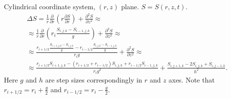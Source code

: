 \documentclass[a4paper,10pt]{article}
\begin{document}
Cylindrical coordinate system,  $(r,z)$ plane. $S = S(r, z, t)$.
\begin{multline}
    \Delta S = \frac{1}{r} \frac{\partial}{\partial r}
    \left( r \frac{\partial S}{\partial r} \right) +
    \frac{\partial^2 S}{\partial z^2}
    \approx
    \\
    \approx
    \frac{1}{r}\frac{\partial}{\partial r}\left(
         r_i \frac{S_{i,j,k} - S_{i-1,j,k}}{g}
    \right) +
    \frac{\partial^2 S}{\partial z^2}
    \approx
    \\
    \approx
    \frac{ r_{i+1/2}\frac{S_{i+1,j,k} - S_{i,j,k}}{g} - r_{i-1/2}\frac{S_{i,j,k} - S_{i-1,j,k}}{g}}{r_i g} +
    \frac{\partial^2 S}{\partial z^2}
    \approx
    \\
    \approx
    \frac{ r_{i+1/2}S_{i+1,j,k} - (r_{i+1/2} + r_{i-1/2})S_{i,j,k} + r_{i-1/2} S_{i-1,j,k} }{r_i g^2} +
    \frac{S_{i,j+1,k} - 2 S_{i,j,k} + S_{i,j-1,k}}{h^2}
    .
\end{multline}
Here $g$ and $h$ are step sizes correspondingly in $r$ and $z$ axes.
Note that $r_{i+1/2} = r_i + \frac{g}{2}$ and $r_{i-1/2} = r_i - \frac{g}{2}$.
\end{document}
